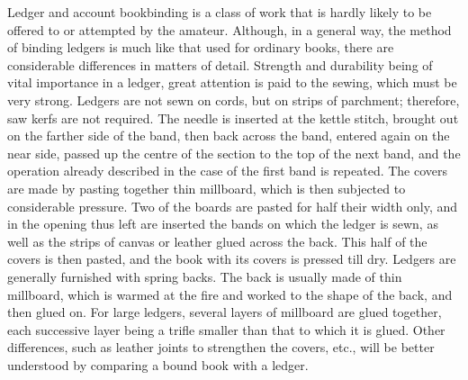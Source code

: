 \documentclass[twoside]{book}
\begin{document}
\noindent
Ledger and account bookbinding is a class of work
that is hardly likely to be offered to or attempted
by the amateur. Although, in a general way, the
method of binding ledgers is much like that used
for ordinary books, there are considerable differences
in matters of detail. Strength and durability
being of vital importance in a ledger, great
attention is paid to the sewing, which must be very
strong. Ledgers are not sewn on cords, but on
strips of parchment; therefore, saw kerfs are not
required. The needle is inserted at the kettle
stitch, brought out on the farther side of the band,
then back across the band, entered again on the
near side, passed up the centre of the section to
the top of the next band, and the operation already
described in the case of the first band is repeated.
The covers are made by pasting together thin millboard,
which is then subjected to considerable
pressure. Two of the boards are pasted for half
their width only, and in the opening thus left are
inserted the bands on which the ledger is sewn, as
well as the strips of canvas or leather glued across
the back. This half of the covers is then pasted,
and the book with its covers is pressed till dry.
Ledgers are generally furnished with spring backs.
The back is usually made of thin millboard, which
is warmed at the fire and worked to the shape of
the back, and then glued on. For large ledgers,
several layers of millboard are glued together, each
successive layer being a trifle smaller than that to
which it is glued. Other differences, such as
\pagebreak
leather joints to strengthen the covers, etc., will be
better understood by comparing a bound book with
a ledger.
\end{document}
